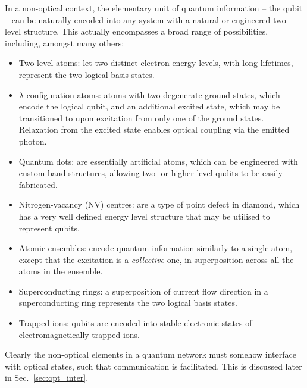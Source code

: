 \documentclass[aps, rmp, twocolumn, amsmath, amssymb, nofootinbib, superscriptaddress, longbibliography, floatfix, table-of-contents, eqsecnum]{revtex4-1}
\begin{document}
In a non-optical context, the elementary unit of quantum information -- the qubit -- can be naturally encoded into any system with a natural or engineered two-level structure. This actually encompasses a broad range of possibilities, including, amongst many others:
\begin{itemize}
\item {}Two-level atoms: let two distinct electron energy levels, with long lifetimes, represent the two logical basis states.
\item {}$\lambda$-configuration atoms: atoms with two degenerate ground states, which encode the logical qubit, and an additional excited state, which may be transitioned to upon excitation from only one of the ground states. Relaxation from the excited state enables optical coupling via the emitted photon.
\item {}Quantum dots: are essentially artificial atoms, which can be engineered with custom band-structures, allowing two- or higher-level qudits to be easily fabricated.
\item {}Nitrogen-vacancy (NV) centres: are a type of point defect in diamond, which has a very well defined energy level structure that may be utilised to represent qubits.
\item {}Atomic ensembles: encode quantum information similarly to a single atom, except that the excitation is a \textit{collective} one, in superposition across all the atoms in the ensemble.
\item {}Superconducting rings: a superposition of current flow direction in a superconducting ring represents the two logical basis states.
\item {}Trapped ions: qubits are encoded into stable electronic states of electromagnetically trapped ions.
\end{itemize}

Clearly the non-optical elements in a quantum network must somehow interface with optical states, such that communication is facilitated. This is discussed later in Sec.~\ref{sec:opt_inter}.
\end{document}
